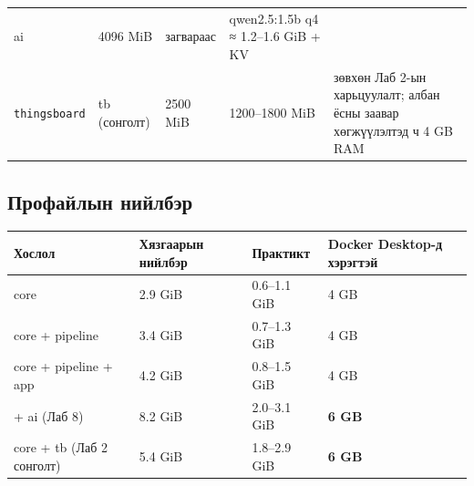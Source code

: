 \begin{longtable}[]{@{}lllll@{}}
\begin{minipage}[t]{0.17\columnwidth}
ai\strut
\end{minipage} & \begin{minipage}[t]{0.17\columnwidth}\raggedright
4096 MiB\strut
\end{minipage} & \begin{minipage}[t]{0.17\columnwidth}\raggedright
загвараас\strut
\end{minipage} & \begin{minipage}[t]{0.17\columnwidth}\raggedright
qwen2.5:1.5b q4 ≈ 1.2--1.6 GiB + KV\strut
\end{minipage}\tabularnewline
\begin{minipage}[t]{0.17\columnwidth}\raggedright
\texttt{thingsboard}\strut
\end{minipage} & \begin{minipage}[t]{0.17\columnwidth}\raggedright
tb (сонголт)\strut
\end{minipage} & \begin{minipage}[t]{0.17\columnwidth}\raggedright
2500 MiB\strut
\end{minipage} & \begin{minipage}[t]{0.17\columnwidth}\raggedright
1200--1800 MiB\strut
\end{minipage} & \begin{minipage}[t]{0.17\columnwidth}\raggedright
зөвхөн Лаб 2-ын харьцуулалт; албан ёсны заавар хөгжүүлэлтэд ч 4 GB RAM\strut
\end{minipage}\tabularnewline
\bottomrule
\end{longtable}\endgroup

\hypertarget{ux43fux440ux43eux444ux430ux439ux43bux44bux43d-ux43dux438ux439ux43bux431ux44dux440}{%
\subsection{Профайлын нийлбэр}\label{ux43fux440ux43eux444ux430ux439ux43bux44bux43d-ux43dux438ux439ux43bux431ux44dux440}}

\begingroup\scriptsize\begin{longtable}[]{@{}llll@{}}
\toprule
Хослол & Хязгаарын нийлбэр & Практикт & Docker Desktop-д хэрэгтэй\tabularnewline
\midrule
\endhead
core & 2.9 GiB & 0.6--1.1 GiB & 4 GB\tabularnewline
core + pipeline & 3.4 GiB & 0.7--1.3 GiB & 4 GB\tabularnewline
core + pipeline + app & 4.2 GiB & 0.8--1.5 GiB & 4 GB\tabularnewline
+ ai (Лаб 8) & 8.2 GiB & 2.0--3.1 GiB & \textbf{6 GB}\tabularnewline
core + tb (Лаб 2 сонголт) & 5.4 GiB & 1.8--2.9 GiB & \textbf{6 GB}\tabularnewline
\bottomrule
\end{longtable}\endgroup


